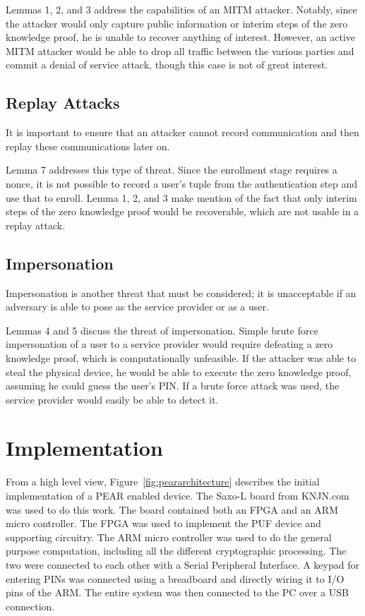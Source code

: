 Lemmas 1, 2, and 3 address the capabilities of an MITM attacker. Notably, since the attacker would only capture
public information or interim steps of the zero knowledge proof, he is unable to recover anything of interest.
However, an active MITM attacker would be able to drop all traffic between the various parties and commit a
denial of service attack, though this case is not of great interest.

\subsection{Replay Attacks}
It is important to ensure that an attacker cannot record communication and then replay these communications
later on.

Lemma 7 addresses this type of threat. Since the enrollment stage requires a nonce, it is not possible
to record a user's tuple from the authentication step and use that to enroll. Lemma 1, 2, and 3 make mention
of the fact that only interim steps of the zero knowledge proof would be recoverable, which are not usable
in a replay attack.

\subsection{Impersonation}
Impersonation is another threat that must be considered; it is unacceptable if an adversary is able to pose as
the service provider or as a user.

Lemmas 4 and 5 discuss the threat of impersonation. Simple brute force impersonation of a user to a service
provider would require defeating a zero knowledge proof, which is computationally unfeasible. If the attacker
was able to steal the physical device, he would be able to execute the zero knowledge proof, assuming he could
guess the user's PIN. If a brute force attack was used, the service provider would easily be able to detect it.

\section{Implementation}
From a high level view, Figure~\ref{fig:peararchitecture} describes the initial implementation of a PEAR enabled device.
The Saxo-L board from KNJN.com~\cite{KNJN} was used to do this work. The board contained both an FPGA and an ARM
micro controller. The FPGA was used to implement the PUF device and supporting circuitry. The ARM micro controller
was used to do the general purpose computation, including all the different cryptographic processing. The two
were connected to each other with a Serial Peripheral Interface. A keypad for entering PINs was connected using a
breadboard and directly wiring it to I/O pins of the ARM. The entire system was then connected to the PC over
a USB connection.

